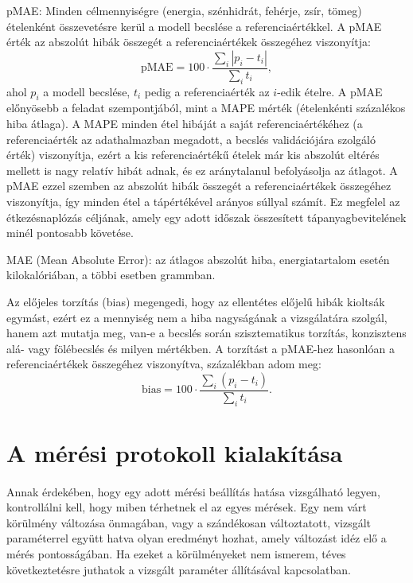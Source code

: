 pMAE: Minden célmennyiségre (energia, szénhidrát, fehérje, zsír, tömeg) ételenként összevetésre kerül a modell becslése a referenciaértékkel. A pMAE érték az abszolút hibák összegét a referenciaértékek összegéhez viszonyítja:
\begin{equation}
  \mathrm{pMAE} = 100\cdot\frac{\sum_i |p_i - t_i|}{\sum_i t_i},
\end{equation}
ahol $p_i$ a modell becslése, $t_i$ pedig a referenciaérték az $i$-edik ételre.
A pMAE előnyösebb a feladat szempontjából, mint a MAPE mérték (ételenkénti százalékos hiba átlaga). A MAPE minden étel hibáját a saját referenciaértékéhez (a referenciaérték az adathalmazban megadott, a becslés validációjára szolgáló érték) viszonyítja, ezért a kis referenciaértékű 
ételek már kis abszolút eltérés mellett is nagy relatív hibát adnak, és ez aránytalanul befolyásolja az átlagot. A pMAE ezzel szemben az abszolút hibák összegét a 
referenciaértékek összegéhez viszonyítja, így minden étel a tápértékével arányos súllyal számít. Ez megfelel az étkezésnaplózás céljának, amely egy adott időszak összesített 
tápanyagbevitelének minél pontosabb követése.

MAE (Mean Absolute Error): az átlagos abszolút hiba, energiatartalom esetén kilokalóriában, a többi esetben grammban.

Az előjeles torzítás (bias) megengedi, hogy az ellentétes előjelű hibák kioltsák egymást, ezért ez a mennyiség nem a hiba nagyságának a vizsgálatára szolgál,
hanem azt mutatja meg, van-e a becslés során szisztematikus torzítás, konzisztens alá- vagy fölébecslés és milyen mértékben.
A torzítást a pMAE-hez hasonlóan a referenciaértékek összegéhez viszonyítva, százalékban adom meg:
\begin{equation}
  \mathrm{bias} = 100\cdot\frac{\sum_i (p_i - t_i)}{\sum_i t_i}.
\end{equation}


\section{A mérési protokoll kialakítása}
\paragraph{}Annak érdekében, hogy egy adott mérési beállítás hatása vizsgálható legyen,
kontrollálni kell, hogy miben térhetnek el az egyes mérések. Egy nem várt körülmény
változása önmagában, vagy a szándékosan változtatott, vizsgált paraméterrel együtt hatva
olyan eredményt hozhat, amely változást idéz elő a mérés pontosságában.
Ha ezeket a körülményeket nem ismerem, téves következtetésre juthatok a vizsgált
paraméter állításával kapcsolatban.

